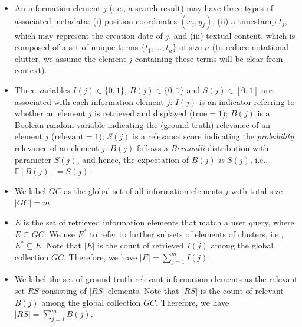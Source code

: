 \begin{itemize}[topsep=2pt,leftmargin=*]
\item An information element $j$ (i.e., a search result) may have three types of associated metadata: (i) position coordinates $(x_{j},y_{j})$, (ii) a timestamp $t_j$, which may represent the creation date of $j$, and (iii) textual content, which is composed of a set of unique terms $\{ t_1,\ldots,t_n \}$ of size $n$ (to reduce notational clutter, we assume the element $j$ containing these terms will be clear from context).

\item Three variables $I(j) \in \{0,1\}$, $B(j) \in \{0,1\}$ and $S(j) \in [0,1]$ are associated with each information element $j$: $I(j)$ is an indicator referring to whether an element $j$ is retrieved and displayed ($\textrm{true}\!=\!1$); $B(j)$ is a Boolean random variable indicating the (ground truth) relevance of an element $j$ ($\textrm{relevant}\!=\!1$); $S(j)$ is a relevance score indicating the \emph{probability} relevance of an element $j$. %
$B(j)$ follows a \emph{Bernoulli} distribution with parameter $S(j)$, and hence, the expectation of $B(j)$ \emph{is} $S(j)$, i.e., 
  $\mathbb{E}[B(j)] = S(j)$.
\item We label $GC$ as the global set of all information elements $j$ with total size $|GC|=m$. %
\item $E$ is the set of retrieved information elements that match a user query, where $E \subseteq  GC$.  We use $E^*$ to refer to further subsets of elements of clusters, i.e., $E^*\subseteq E$. 
Note that $|E|$ is the count of retrieved $I(j)$ among the global collection $GC$. Therefore, we have $|E| = \sum_{j=1}^m I(j)$.
\item We label the set of ground truth relevant information elements as the relevant set $RS$ consisting of $|RS|$ elements. 
Note that $|RS|$ is the count of relevant $B(j)$ among the global collection $GC$. Therefore, we have $|RS| = \sum_{j=1}^m B(j)$. %


\end{itemize}
